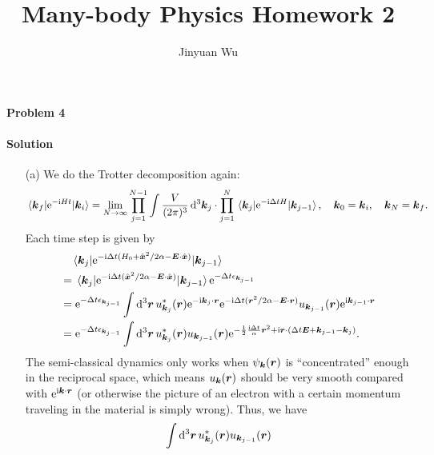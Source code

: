 \documentclass[hyperref, a4paper]{article}
\title{Many-body Physics Homework 2}
\author{Jinyuan Wu}
\newcommand*{\ii}{\mathrm{i}}
\newcommand*{\ee}{\mathrm{e}}
\begin{document}
\maketitle

\paragraph{Problem 4} 

\paragraph{Solution} \begin{itemize}
\item[(a)] We do the Trotter decomposition again:
\[
    \mel{\vb*{k}_f}{\ee^{- \ii H t}}{\vb*{k}_i} = \lim_{N \to \infty}
    \prod_{j=1}^{N-1} \int \frac{V}{(2\pi)^3} \dd[3]{\vb*{k}_j} \cdot \prod_{j=1}^{N} 
    \mel{\vb*{k}_j}{\ee^{- \ii \Delta t H}}{\vb*{k}_{j-1}}, \quad 
    \vb*{k}_{0} = \vb*{k}_i, \quad \vb*{k}_N = \vb*{k}_f.
\]
Each time step is given by 
\[
    \begin{aligned}
        &\quad \mel{\vb*{k}_j}{\ee^{- \ii \Delta t (H_0 + \hat{\vb*{x}}^2 / 2 \alpha - \vb*{E} \cdot \hat{\vb*{x}})}}{\vb*{k}_{j-1}} \\
        &= \mel{\vb*{k}_j}{\ee^{- \ii \Delta t ( \hat{\vb*{x}}^2 / 2 \alpha - \vb*{E} \cdot \hat{\vb*{x}})}}{\vb*{k}_{j-1}} \ee^{- \Delta t \epsilon_{\vb*{k}_{j-1}}} \\
        &= \ee^{- \Delta t \epsilon_{\vb*{k}_{j-1}}} \int \dd[3]{\vb*{r}} u^*_{\vb*{k}_j}(\vb*{r}) \ee^{- \ii \vb*{k}_j \cdot \vb*{r}}
        \ee^{- \ii \Delta t (\vb*{r}^2 / 2\alpha - \vb*{E} \cdot \vb*{r})} u_{\vb*{k}_{j-1}}(\vb*{r}) \ee^{\ii \vb*{k}_{j-1} \cdot \vb*{r}} \\
        &= \ee^{- \Delta t \epsilon_{\vb*{k}_{j-1}}} \int \dd[3]{\vb*{r}} u^*_{\vb*{k}_{j}}(\vb*{r}) u_{\vb*{k}_{j-1}}(\vb*{r})
        \ee^{- \frac{1}{2} \frac{\ii \Delta t}{\alpha} \vb*{r}^2 + \ii \vb*{r} \cdot (\Delta t \vb*{E} + \vb*{k}_{j-1} - \vb*{k}_j) }.
    \end{aligned}
\]
The semi-classical dynamics only works when $\psi_{\vb*{k}}(\vb*{r})$ is 
``concentrated'' enough in the reciprocal space,
which means $u_{\vb*{k}}(\vb*{r})$ should be very smooth compared with $\ee^{\ii \vb*{k} \cdot \vb*{r}}$
(or otherwise the picture of an electron with a certain momentum traveling in the material is simply wrong).
Thus, we have 
\[
    \begin{aligned}
        &\quad \int \dd[3]{\vb*{r}} u^*_{\vb*{k}_{j}}(\vb*{r}) u_{\vb*{k}_{j-1}}(\vb*{r})

\end{aligned}\]
\end{itemize}
\end{document}

